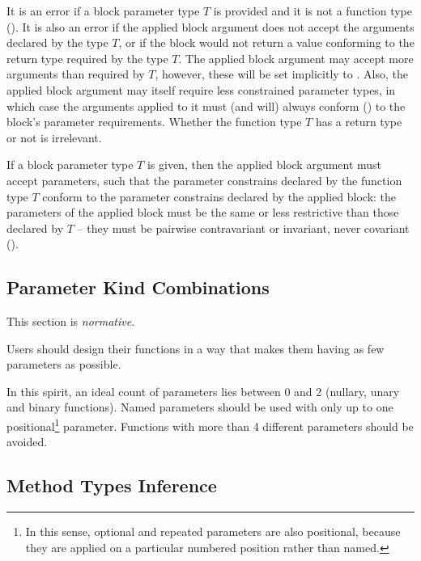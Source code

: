 It is an error if a block parameter type $T$ is provided and it is not a function type (). It is also an error if the applied block argument does not accept the arguments declared by the type $T$, or if the block would not return a value conforming to the return type required by the type $T$. The applied block argument may accept more arguments than required by $T$, however, these will be set implicitly to . Also, the applied block argument may itself require less constrained parameter types, in which case the arguments applied to it must (and will) always conform () to the block's parameter requirements. Whether the function type $T$ has a return type or not is irrelevant. 

If a block parameter type $T$ is given, then the applied block argument must accept parameters, such that the parameter constrains declared by the function type $T$ conform to the parameter constrains declared by the applied block: the parameters of the applied block must be the same or less restrictive than those declared by $T$ -- they must be pairwise contravariant or invariant, never covariant (). 

\subsection{Parameter Kind Combinations}

This section is {\em normative}. 

Users should design their functions in a way that makes them having as few parameters as possible. 

In this spirit, an ideal count of parameters lies between 0 and 2 (nullary, unary and binary functions). Named parameters should be used with only up to one positional\footnote{In this sense, optional and repeated parameters are also positional, because they are applied on a particular numbered position rather than named.} parameter. Functions with more than 4 different parameters should be avoided. 

\subsection{Method Types Inference}
\label{sec:method-types-inference}

